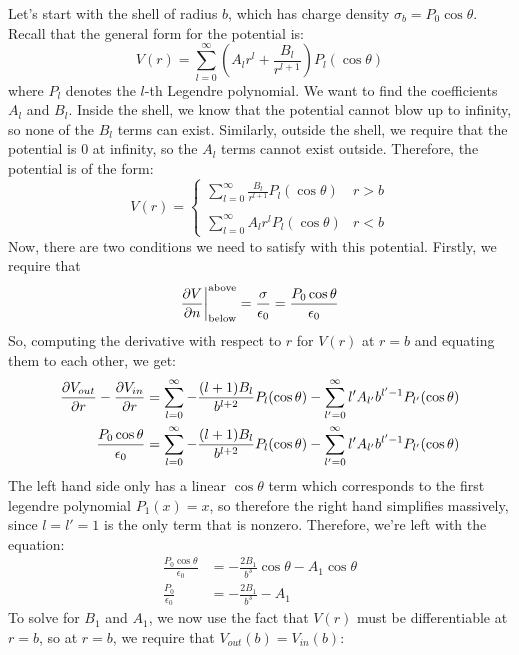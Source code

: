 \documentclass[10pt]{article}
\begin{document}
\begin{solution}
		Let's start with the shell of radius $b$, which has charge density $\sigma_b = P_0 \cos \theta$. Recall
		that the general form for the potential is: 
		\[
			V(r) = \sum_{l = 0}^\infty \left( A_l r^l + \frac{B_l}{r^{l+1}} \right) P_l(\cos \theta)
		\] 
		where $P_l$ denotes the $l$-th Legendre polynomial. We want to find the coefficients $A_l$ and $B_l$.
		Inside the shell, we know that the potential cannot blow up to infinity, so none of the $B_l$ terms
		can exist. Similarly, outside the shell, we require that the potential is 0 at infinity, so the $A_l$
		terms cannot exist outside. Therefore, the potential is of the form: 
		\[
		V(r) = \begin{cases}
			\displaystyle	\sum_{ l= 0}^\infty \frac{B_l}{r^{l+1}}P_l(\cos \theta) & r > b\\
			\\
			\displaystyle \sum_{l = 0}^\infty A_l r^l P_l (\cos \theta) & r < b
		\end{cases}
		\] 
		Now, there are two conditions we need to satisfy with this potential. Firstly, we require that
		\[
			\pdv{V}{n}\bigg|_{\text{below}}^{\text{above}} = \frac{\sigma}{\epsilon_0} = \frac{P_0 \cos \theta}{
			\epsilon_0}
		\] 
		So, computing the derivative with respect to $r$ for $V(r)$ at $r = b$ and equating them to each other, 
		we get:
		\begin{align*}
			\pdv{V_{out}}{r} - \pdv{V_{in}}{r} &= \sum_{l = 0}^\infty - \frac{(l + 1)B_l}{b^{l + 2}}P_l (\cos 
			\theta) - \sum_{l' = 0}^\infty l' A_{l'} b^{l' -1} P_{l'}(\cos \theta)\\
			\frac{P_0 \cos \theta}{\epsilon_0} &=  \sum_{l = 0}^\infty - \frac{(l + 1)B_l}{b^{l + 2}}P_l
			(\cos \theta) - \sum_{l' = 0}^\infty l' A_{l'} b^{l' -1} P_{l'}(\cos \theta)
		\end{align*}
		The left hand side only has a linear $\cos \theta$ term which corresponds to the first legendre
		polynomial $P_1(x) = x$, so therefore the right hand simplifies massively, since $l = l' = 1$ is 
		the only term that is nonzero. Therefore, we're left with the equation:
		\begin{align*}
			\frac{P_0 \cos \theta}{\epsilon_0} &=  -\frac{2B_1}{b^3}\cos \theta - A_1 \cos \theta \\
			\frac{P_0}{\epsilon_0} &= -\frac{2B_1}{b^3} - A_1
		\end{align*}
		To solve for $B_1$ and $A_1$, we now use the fact that $V(r)$ must be differentiable at $r = b$, so 
		at $r = b$, we require that $V_{out}(b) = V_{in}(b)$: 
		\begin{align*}

\end{align*}
\end{solution}
\end{document}
